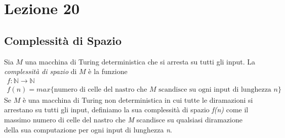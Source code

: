 \section{Lezione 20}

\subsection{Complessità di Spazio}

Sia $M$ una macchina di Turing deterministica che si arresta su tutti gli input. La \emph{complessità di spazio} di $M$ è la funzione 
\begin{gather*}
	f:\mathbb{N} \to \mathbb{N}\\
	f(n) = max\{ \text{numero di celle del nastro che } M \text{ scandisce su ogni input di lunghezza } n \}
\end{gather*}
Se $M$ è una macchina di Turing non deterministica in cui tutte le diramazioni si arrestano su tutti gli input, definiamo la sua complessità di spazio \emph{f(n)} come il massimo numero di celle del nastro che \emph{M} scandisce su qualsiasi diramazione della sua computazione per ogni input di lunghezza \emph{n}.

